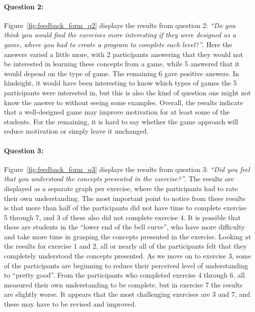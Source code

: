 \paragraph{Question 2:} Figure~\ref{fig:feedback_form_q2} displays the results from question 2: \emph{``Do you think you would find the exercises more interesting if they were designed as a game, where you had to create a program to complete each level?''}. Here the answers varied a little more, with 2 participants answering that they would not be interested in learning these concepts from a game, while 5 answered that it would depend on the type of game. The remaining 6 gave positive answers. In hindsight, it would have been interesting to know which types of games the 5 participants were interested in, but this is also the kind of question one might not know the answer to without seeing some examples. Overall, the results indicate that a well-designed game may improve motivation for at least some of the students. For the remaining, it is hard to say whether the game approach will reduce motivation or simply leave it unchanged.

\paragraph{Question 3:} Figure~\ref{fig:feedback_form_q3} displays the results from question 3: \emph{``Did you feel that you understood the concepts presented in the exercise?''}. The results are displayed as a separate graph per exercise, where the participants had to rate their own understanding. The most important point to notice from these results is that more than half of the participants did not have time to complete exercise 5 through 7, and 3 of these also did not complete exercise 4. It is possible that these are students in the ``lower end of the bell curve'', who have more difficulty and take more time in grasping the concepts presented in the exercise. Looking at the results for exercise 1 and 2, all or nearly all of the participants felt that they completely understood the concepts presented. As we move on to exercise 3, some of the participants are beginning to reduce their perceived level of understanding to ``pretty good''. From the participants who completed exercise 4 through 6, all measured their own understanding to be complete, but in exercise 7 the results are slightly worse. It appears that the most challenging exercises are 3 and 7, and these may have to be revised and improved.

